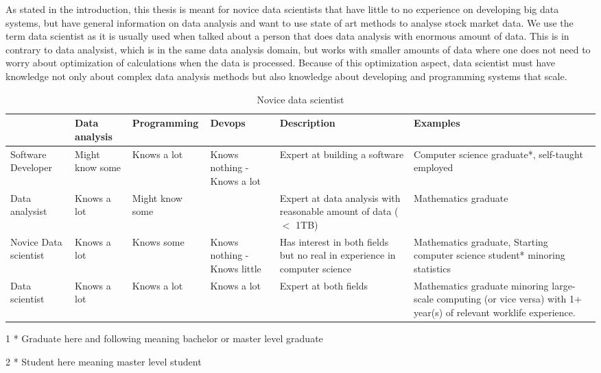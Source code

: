 As stated in the introduction, this thesis is meant for novice data scientists that have little to no experience on developing big data systems, but have general information on data analysis and want to use state of art methods to analyse stock market data.
We use the term data scientist as it is usually used when talked about a person that does data analysis with enormous amount of data.
This is in contrary to data analysist, which is in the same data analysis domain, but works with smaller amounts of data where one does not need to worry about optimization of calculations when the data is processed. \cite{voulgaris}
Because of this optimization aspect, data scientist must have knowledge not only about complex data analysis methods but also knowledge about developing and programming systems that scale.
\begin{sidewaystable}
\centering
  \caption{Novice data scientist}
  \begin{threeparttable}
      \begin{tabular}{|p{2cm}|>{\centering\arraybackslash}p{2cm}|>{\centering\arraybackslash}p{3cm}|p{3cm}|p{4cm}|p{4cm}|}
      \hline
      & Data analysis & Programming & Devops & Description & Examples \\ \hline
      Software Developer & Might know some & Knows a lot & Knows nothing - Knows a lot & Expert at building a software & Computer science graduate*, self-taught employed \\ \hline
      Data analysist & Knows a lot & Might know some & & Expert at data analysis with reasonable amount of data ($<$ 1TB) & Mathematics graduate \\ \hline
      Novice Data scientist & Knows a lot & Knows some & Knows nothing - Knows little & Has interest in both fields but no real in experience in computer science & Mathematics graduate, Starting computer science student* minoring statistics \\ \hline
      Data scientist & Knows a lot & Knows a lot & Knows a lot &  Expert at both fields & Mathematics graduate minoring large-scale computing (or vice versa) with 1+ year(s) of relevant worklife experience. \\ \hline
      \end{tabular}
      \begin{tablenotes}\footnotesize
        \item[1] * Graduate here and following meaning bachelor or master level graduate
        \item[2] * Student here meaning master level student
    \end{tablenotes}
  \end{threeparttable}
\end{sidewaystable}

